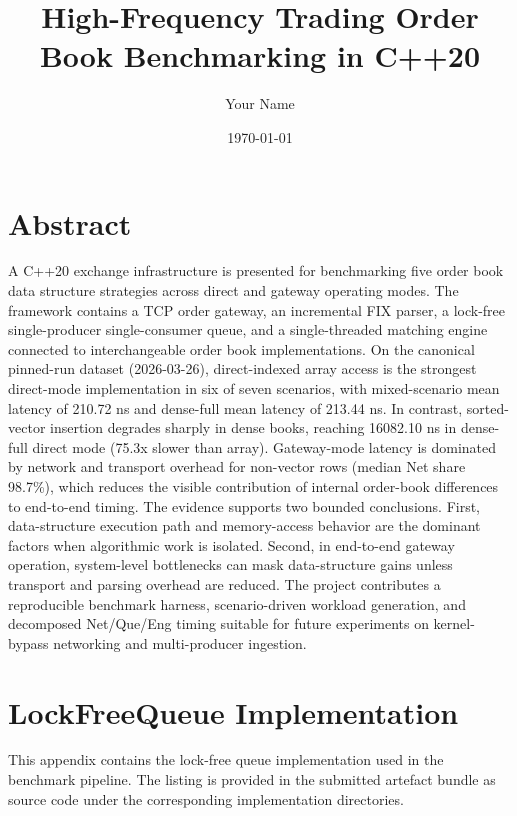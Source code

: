 \documentclass[12pt,a4paper]{report}
\title{High-Frequency Trading Order Book Benchmarking in C++20}
\author{Your Name}
\date{\today}
\begin{document}
\maketitle
\tableofcontents
\listoffigures
\listoftables

\chapter*{Abstract}
A C++20 exchange infrastructure is presented for benchmarking five order book data structure strategies across direct and gateway operating modes. The framework contains a TCP order gateway, an incremental FIX parser, a lock-free single-producer single-consumer queue, and a single-threaded matching engine connected to interchangeable order book implementations. On the canonical pinned-run dataset (2026-03-26), direct-indexed array access is the strongest direct-mode implementation in six of seven scenarios, with mixed-scenario mean latency of 210.72 ns and dense-full mean latency of 213.44 ns. In contrast, sorted-vector insertion degrades sharply in dense books, reaching 16082.10 ns in dense-full direct mode (75.3x slower than array). Gateway-mode latency is dominated by network and transport overhead for non-vector rows (median Net share 98.7\%), which reduces the visible contribution of internal order-book differences to end-to-end timing. The evidence supports two bounded conclusions. First, data-structure execution path and memory-access behavior are the dominant factors when algorithmic work is isolated. Second, in end-to-end gateway operation, system-level bottlenecks can mask data-structure gains unless transport and parsing overhead are reduced. The project contributes a reproducible benchmark harness, scenario-driven workload generation, and decomposed Net/Que/Eng timing suitable for future experiments on kernel-bypass networking and multi-producer ingestion.

\clearpage
{}











\appendix
\chapter{LockFreeQueue Implementation}
This appendix contains the lock-free queue implementation used in the benchmark pipeline. The listing is provided in the submitted artefact bundle as source code under the corresponding implementation directories.
\end{document}
